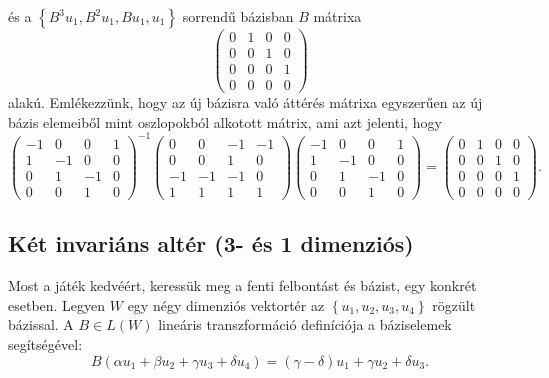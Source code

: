 \documentclass[9pt, a4paper, showtrims]{memoir}
\theoremstyle{plain}
\theoremstyle{remark}
\theoremstyle{definition}
\begin{document}
és a $\left\{ B^3u_1,B^2u_1,Bu_1,u_1 \right\}$ sorrendű bázisban $B$ mátrixa
\[
	\begin{pmatrix}
		0 & 1 & 0 & 0 \\
		0 & 0 & 1 & 0 \\
		0 & 0 & 0 & 1 \\
		0 & 0 & 0 & 0
	\end{pmatrix}
\]
alakú.
Emlékezzünk, hogy az új bázisra való áttérés mátrixa egyszerűen az új bázis
elemeiből mint oszlopokból alkotott mátrix, ami azt jelenti, hogy
\[
	\begin{pmatrix}
		-1 & 0  & 0  & 1 \\
		1  & -1 & 0  & 0 \\
		0  & 1  & -1 & 0 \\
		0  & 0  & 1  & 0
	\end{pmatrix}^{-1}
	\begin{pmatrix}
		0  & 0  & -1 & -1 \\
		0  & 0  & 1  & 0  \\
		-1 & -1 & -1 & 0  \\
		1  & 1  & 1  & 1
	\end{pmatrix}
	\begin{pmatrix}
		-1 & 0  & 0  & 1 \\
		1  & -1 & 0  & 0 \\
		0  & 1  & -1 & 0 \\
		0  & 0  & 1  & 0
	\end{pmatrix}
	=
	\begin{pmatrix}
		0 & 1 & 0 & 0 \\
		0 & 0 & 1 & 0 \\
		0 & 0 & 0 & 1 \\
		0 & 0 & 0 & 0
	\end{pmatrix}.
\]
\subsection{Két invariáns altér (3- és 1 dimenziós)}
Most a játék kedvéért, keressük meg a fenti  felbontást és bázist, egy konkrét esetben.
Legyen $W$ egy négy dimenziós vektortér az $\left\{ u_1,u_2,u_3,u_4 \right\}$ rögzült bázissal.
A $B\in L\left( W \right)$ lineáris transzformáció definíciója a báziselemek segítségével:
\[
	B\left( \alpha u_1+\beta u_2 +\gamma u_3+\delta u_4 \right)
	=
	\left( \gamma-\delta \right)u_1+
	\gamma u_2+
	\delta u_3.
\]
\end{document}
